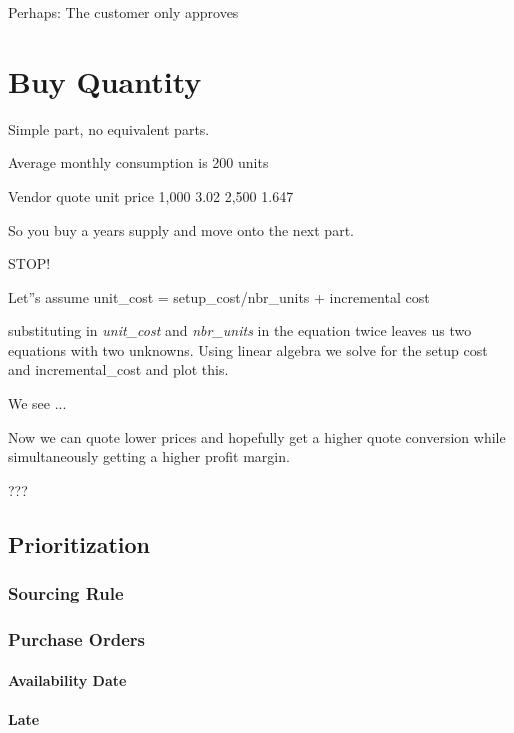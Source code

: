 \documentclass[letterpaper,10pt,english]{sphinxmanual}
\begin{document}
Perhaps: The customer only approves


\section{Buy Quantity}
\label{BusinessProcessReengineering:buy-quantity}
Simple part, no equivalent parts.

Average monthly consumption is 200 units

Vendor quote unit price 1,000 3.02 2,500 1.647

So you buy a years supply and move onto the next part.

STOP!

Let''s assume unit\_cost = setup\_cost/nbr\_units + incremental cost

substituting in \emph{unit\_cost} and \emph{nbr\_units} in the equation twice
leaves us two equations with two unknowns. Using linear algebra we solve
for the setup cost and incremental\_cost and plot this.

We see ...

Now we can quote lower prices and hopefully get a higher quote
conversion while simultaneously getting a higher profit margin.

???


\subsection{Prioritization}
\label{BusinessProcessReengineering:prioritization}

\subsubsection{Sourcing Rule}
\label{BusinessProcessReengineering:sourcing-rule}

\subsubsection{Purchase Orders}
\label{BusinessProcessReengineering:purchase-orders}

\paragraph{Availability Date}
\label{BusinessProcessReengineering:availability-date}

\paragraph{Late}
\label{BusinessProcessReengineering:late}
\end{document}
